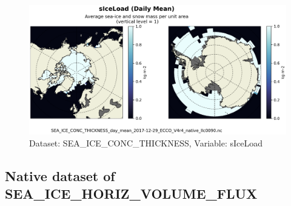 \begin{figure}[H]
\centering
\includegraphics[scale=0.55]{../images/plots/native_plots/Sea-Ice_and_Snow_Concentration_and_Thickness/sIceLoad.png}
\caption{Dataset: SEA\_ICE\_CONC\_THICKNESS, Variable: sIceLoad}
\label{tab:table-SEA_ICE_CONC_THICKNESS_sIceLoad-Plot}
\end{figure}
\newpage
\subsection{Native dataset of SEA\_ICE\_HORIZ\_VOLUME\_FLUX}
\newp

